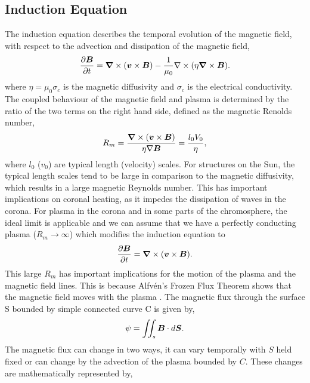 \subsection{Induction Equation}
\label{section:cont_eq}
The induction equation describes the temporal evolution of the magnetic field, with respect to the advection and dissipation of the magnetic field,
\begin{equation}\label{eq89}
\frac{\partial \boldsymbol{B}}{\partial t} = \boldsymbol{\nabla} \times (\boldsymbol{v} \times \boldsymbol{B}) - \frac{1}{\mu_0} \nabla \times (\eta \boldsymbol{\nabla} \times \boldsymbol{B}).
\end{equation}
where $\eta= \mu_0 \sigma_c$ is the magnetic diffusivity and $\sigma_c$ is the electrical conductivity. The coupled behaviour of the magnetic field and plasma is determined by the ratio of the two terms on the right hand side, defined as the magnetic Renolds number,
\begin{equation}
    R_m = \frac{\boldsymbol{\nabla} \times (\boldsymbol{v} \times \boldsymbol{B})}{\eta \nabla \boldsymbol{B}}=\frac{l_0 V_0}{\eta},
\end{equation}
where $l_0$ ($v_0$) are typical length (velocity) scales. For structures on the Sun, the typical length scales tend to be large in comparison to the magnetic diffusivity, which results in a large magnetic Reynolds number. This has important implications on coronal heating, as it impedes the dissipation of waves in the corona. For plasma in the corona and in some parts of the chromosphere, the ideal limit is applicable and we can assume that we have a perfectly conducting plasma ($R_m\to \infty$) which modifies the induction equation to
\begin{equation}\label{perf_induct}
\frac{\partial \boldsymbol{B}}{\partial t} = \boldsymbol{\nabla} \times (\boldsymbol{v} \times \boldsymbol{B}).
\end{equation}
This large $R_m$ has important implications for the motion of the plasma and the magnetic field lines. This is because Alfv\'{e}n's Frozen Flux Theorem shows that the magnetic field moves with the plasma \citep{priest2014magnetohydrodynamics}. The magnetic flux through the surface S bounded by simple connected curve C is given by,
\begin{equation}
    \psi = \iint_s \boldsymbol{B} \cdot d\boldsymbol{S}.
\end{equation}
The magnetic flux can change in two ways, it can vary temporally with $S$ held fixed or can change by the advection of the plasma bounded by $C$. These changes are mathematically represented by,
